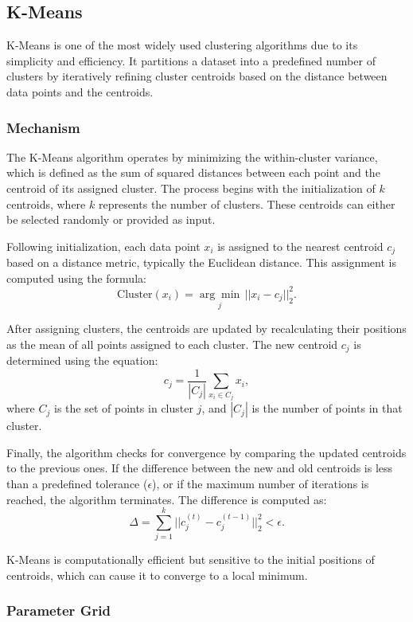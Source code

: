 
\subsection{K-Means}
\label{subsec:methods-kmeans}

K-Means is one of the most widely used clustering algorithms due to its simplicity and efficiency. It partitions a dataset into a predefined number of clusters by iteratively refining cluster centroids based on the distance between data points and the centroids.

\subsubsection{Mechanism}

The K-Means algorithm operates by minimizing the within-cluster variance, which is defined as the sum of squared distances between each point and the centroid of its assigned cluster. The process begins with the initialization of \(k\) centroids, where \(k\) represents the number of clusters. These centroids can either be selected randomly or provided as input.

Following initialization, each data point \(x_i\) is assigned to the nearest centroid \(c_j\) based on a distance metric, typically the Euclidean distance. This assignment is computed using the formula:  
\[
\text{Cluster}(x_i) = \underset{j}{\arg\min} \, ||x_i - c_j||_2^2.
\]

After assigning clusters, the centroids are updated by recalculating their positions as the mean of all points assigned to each cluster. The new centroid \(c_j\) is determined using the equation:  
\[
c_j = \frac{1}{|C_j|} \sum_{x_i \in C_j} x_i,
\]  
where \(C_j\) is the set of points in cluster \(j\), and \(|C_j|\) is the number of points in that cluster.

Finally, the algorithm checks for convergence by comparing the updated centroids to the previous ones. If the difference between the new and old centroids is less than a predefined tolerance (\(\epsilon\)), or if the maximum number of iterations is reached, the algorithm terminates. The difference is computed as:  
\[
\Delta = \sum_{j=1}^{k} ||c_j^{(t)} - c_j^{(t-1)}||_2^2 < \epsilon.
\]

K-Means is computationally efficient but sensitive to the initial positions of centroids, which can cause it to converge to a local minimum.


\subsubsection{Parameter Grid}

